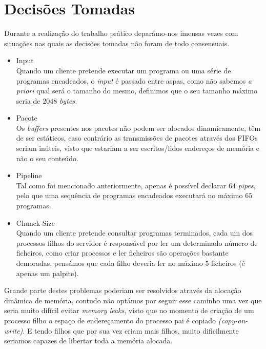 \documentclass[12pt,a4paper]{report}
\begin{document}
        
\chapter{Decisões Tomadas}

    Durante a realização do trabalho prático deparámo-nos imensas vezes com situações nas quais as decisões tomadas não foram de todo consensuais.

    \begin{itemize}
        \item\large Input \\ \normalsize Quando um cliente pretende executar um programa ou uma série de programas encadeados, o \textit{input} é passado entre aspas, como não sabemos \textit{a priori} qual será o tamanho do mesmo, definimos que o seu tamanho máximo seria de $2048$ \textit{bytes.} 

        \item\large Pacote \\ \normalsize Os \textit{buffers} presentes nos pacotes não podem ser alocados dinamicamente, têm de ser estáticos, caso contrário as transmissões de pacotes através dos FIFOs seriam inúteis, visto que estariam a ser escritos/lidos endereços de memória e não o seu conteúdo.   

        \item\large Pipeline \\ \normalsize Tal como foi mencionado anteriormente, apenas é possível declarar $64$ \textit{pipes}, pelo que uma sequência de programas encadeados executará no máximo $65$ programas.  

        \item\large Chunck Size \\ \normalsize Quando um cliente pretende consultar programas terminados, cada um dos processos filhos do servidor é responsável por ler um determinado número de ficheiros, como criar processos e ler ficheiros são operações bastante demoradas, pensámos que cada filho deveria ler no máximo $5$ ficheiros (é apenas um palpite).
    \end{itemize}


    Grande parte destes problemas poderiam ser resolvidos através da alocação dinâmica de memória, contudo não optámos por seguir esse caminho uma vez que seria muito difícil evitar \textit{memory leaks}, visto que no momento de criação de um processo filho o espaço de endereçamento do processo pai é copiado \textit{(copy-on-write)}. E tendo filhos que por sua vez criam mais filhos, muito dificilmente seriamos capazes de libertar toda a memória alocada. 
\end{document}
